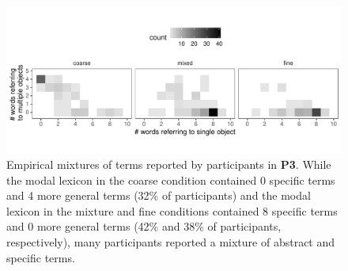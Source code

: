\documentclass[10pt, man, floatsintext]{apa7}
\begin{document}
 \begin{figure}
\centering
    \includegraphics[scale=.9]{mixtureOfTerms.pdf}
  \caption{Empirical mixtures of terms reported by participants in \textbf{P3}. While the modal lexicon in the coarse condition contained 0 specific terms and 4 more general terms (32\% of participants) and the modal lexicon in the mixture and fine conditions contained 8 specific terms and 0 more general terms (42\% and 38\% of participants, respectively), many participants reported a mixture of abstract and specific terms.}
  \label{fig:mixtureOfTerms}
\end{figure}
\end{document}
